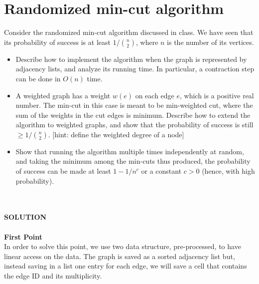 \documentclass[a4paper]{article}
\begin{document}
\section*{Randomized min-cut algorithm}
Consider the randomized min-cut algorithm discussed in class.
We have seen that its probability of success is at least $1 / \binom{n}{2}$, where $n$ is the number of its vertices.
\begin{itemize}
\item Describe how to implement the algorithm when the graph is represented by adjacency lists, and analyze its running time.
In particular, a contraction step can be done in $O(n)$ time.
\item A weighted graph has a weight $w(e)$ on each edge $e$, which  is  a  positive  real number.
The  min-cut  in  this  case  is  meant  to  be  min-weighted  cut,  where  the sum  of  the  weights  in  the  cut  edges  is  minimum.
Describe  how  to  extend  the algorithm  to  weighted  graphs,  and  show  that  the  probability  of  success  is  still $\geq 1/\binom{n}{2}$. [hint: define the weighted degree of a node]
\item Show that running the algorithm multiple times independently at random, and taking the minimum among the min-cuts thus produced, the probability of success can be made at least $1 - 1/n^c$ or a constant $c > 0$ (hence, with high probability).
\end{itemize}
\
\\
\\
\textbf{SOLUTION}
\\
\\

\noindent
\textbf{First Point}
\\
In order to solve this point, we use two data structure, pre-processed, to have linear access on the data. The graph is saved as a sorted adjacency list but, instead saving in a list one entry for each edge, we will save a cell that contains the edge ID and its multiplicity. 

\end{document}
